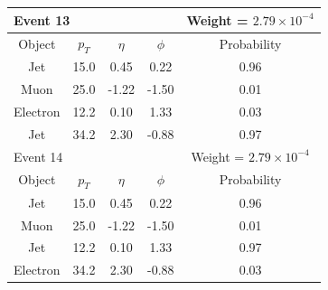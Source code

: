 \documentclass{cmspaper}
\begin{document}
\begin{tabular}{|c|c|c|c|c|}
\multicolumn{4}{|l|}{Event 13} & Weight = $2.79 \times 10^{-4}$ \\
\hline
Object & $p_T$ & $\eta$ & $\phi$ & Probability \\ 
 \hline 
Jet & 15.0 & 0.45 & 0.22 & 0.96 \\
Muon & 25.0 & -1.22 & -1.50 & 0.01 \\
Electron & 12.2 & 0.10 & 1.33 &  0.03 \\
Jet & 34.2 & 2.30 & -0.88 & 0.97 \\
 \hline 
 \hline 

\multicolumn{4}{|l|}{Event 14} & Weight = $2.79 \times 10^{-4}$ \\
\hline
Object & $p_T$ & $\eta$ & $\phi$ & Probability \\ 
 \hline 
Jet & 15.0 & 0.45 & 0.22 & 0.96 \\
Muon & 25.0 & -1.22 & -1.50 & 0.01 \\
Jet & 12.2 & 0.10 & 1.33 &  0.97 \\
Electron & 34.2 & 2.30 & -0.88 & 0.03 \\
 \hline 
 \hline 

\end{tabular} 
\end{document}
